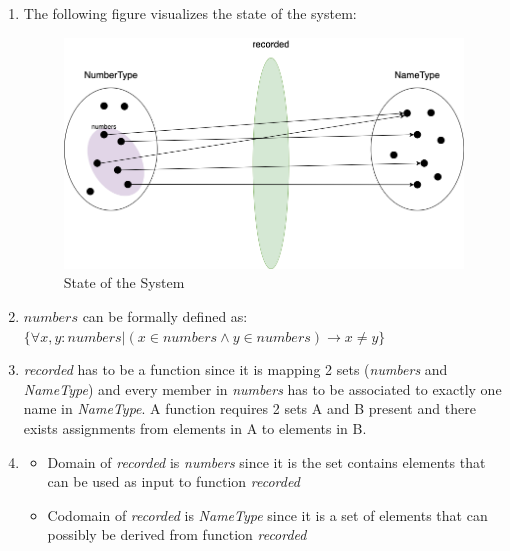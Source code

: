 \begin{enumerate}
    \item The following figure visualizes the state of the system:
        \begin{figure}[h]
        \centering
        \includegraphics[scale=0.45]{images/Diagram.png}
        \caption{State of the System}
        \label{fig:Diagram}
        \end{figure}
    \item $numbers$ can be formally defined as: \\
    $\{ \forall x, y: numbers | (x \in numbers \wedge y \in numbers) \rightarrow x \neq y \}$
\item \emph{recorded} has to be a function since it is mapping 2 sets (\emph{numbers} and \emph{NameType}) and every member in \emph{numbers} has to be associated to exactly one name in \emph{NameType}. A function requires 2 sets A and B present and there exists assignments from elements in A to elements in B.
\item 
    \begin{itemize}
        \item[] Domain of \emph{recorded} is \emph{numbers} since it is the set contains elements that can be used as input to function \emph{recorded}
        \item[] Codomain of \emph{recorded} is \emph{NameType} since it is a set of elements that can possibly be derived from function \emph{recorded}
    \end{itemize}
 

\end{enumerate}
